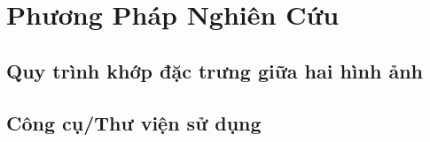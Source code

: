 \newpage
\section{Phương Pháp Nghiên Cứu}
\subsection{Quy trình khớp đặc trưng giữa hai hình ảnh}
\subsection{Công cụ/Thư viện sử dụng}